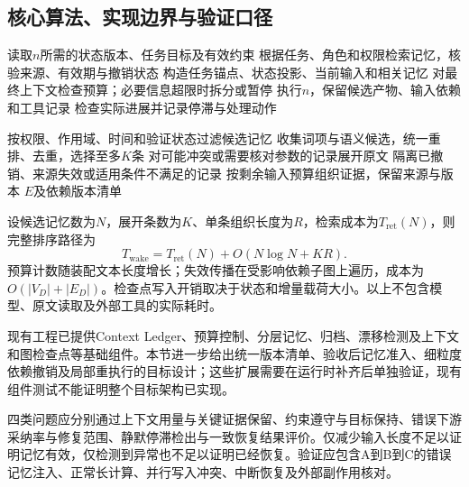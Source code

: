 \subsection{核心算法、实现边界与验证口径}

\begin{algorithm}[htbp]
\caption{共享状态与四级记忆驱动的节点执行}
\label{alg:anchor_runtime}
读取$n$所需的状态版本、任务目标及有效约束\;
根据任务、角色和权限检索记忆，核验来源、有效期与撤销状态\;
构造任务锚点、状态投影、当前输入和相关记忆\;
对最终上下文检查预算；必要信息超限时拆分或暂停\;
执行$n$，保留候选产物、输入依赖和工具记录\;
检查实际进展并记录停滞与处理动作\;
\end{algorithm}

\begin{algorithm}[htbp]
\caption{带有效性检查的分级证据唤醒}
\label{alg:anchor_wakeup}
按权限、作用域、时间和验证状态过滤候选记忆\;
收集词项与语义候选，统一重排、去重，选择至多$K$条\;
对可能冲突或需要核对参数的记录展开原文\;
隔离已撤销、来源失效或适用条件不满足的记录\;
按剩余输入预算组织证据，保留来源与版本\;
\Return $E$及依赖版本清单\;
\end{algorithm}

设候选记忆数为$N$，展开条数为$K$、单条组织长度为$R$，检索成本为$T_{\mathrm{ret}}(N)$，则完整排序路径为
\begin{equation}
T_{\mathrm{wake}}=T_{\mathrm{ret}}(N)+O(N\log N+KR).
\label{eq:anchor_wakeup_cost}
\end{equation}
预算计数随装配文本长度增长；失效传播在受影响依赖子图上遍历，成本为$O(|V_D|+|E_D|)$。检查点写入开销取决于状态和增量载荷大小。以上不包含模型、原文读取及外部工具的实际耗时。

现有工程已提供Context Ledger、预算控制、分层记忆、归档、漂移检测及上下文和图检查点等基础组件。本节进一步给出统一版本清单、验收后记忆准入、细粒度依赖撤销及局部重执行的目标设计；这些扩展需要在运行时补齐后单独验证，现有组件测试不能证明整个目标架构已实现。

四类问题应分别通过上下文用量与关键证据保留、约束遵守与目标保持、错误下游采纳率与修复范围、静默停滞检出与一致恢复结果评价。仅减少输入长度不足以证明记忆有效，仅检测到异常也不足以证明已经恢复。验证应包含A到B到C的错误记忆注入、正常长计算、并行写入冲突、中断恢复及外部副作用核对。

